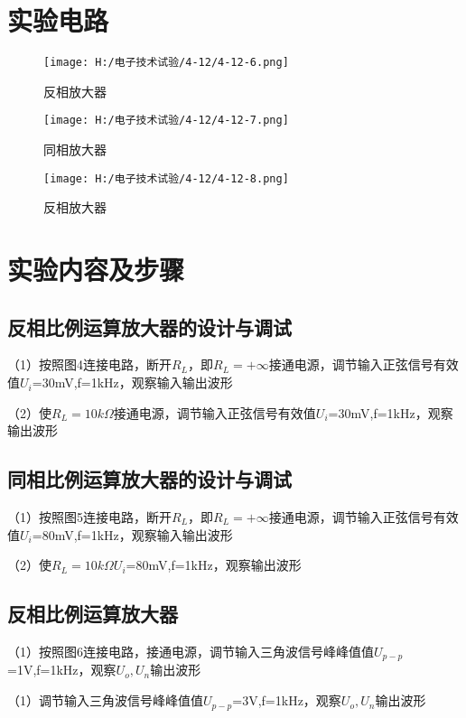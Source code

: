 \documentclass{article}
\begin{document}
\section{ 实验电路}

\begin{figure}[h]
	\begin{minipage}[t]{0.5\linewidth} %
	  \centering   
	  \texttt{[image: H:/电子技术试验/4-12/4-12-6.png]}   
	  \caption{反相放大器}   
	  \label{fig:side:a}   
	\end{minipage}%
	\begin{minipage}[t]{0.5\linewidth}   
	  \centering   
	  \texttt{[image: H:/电子技术试验/4-12/4-12-7.png]}   
	  \caption{同相放大器}   
	  \label{fig:side:b}   
	\end{minipage}   
  \end{figure}

\begin{figure}[h]
	\centering
	\texttt{[image: H:/电子技术试验/4-12/4-12-8.png]}
	\caption{反相放大器} \label{fig:aa}
\end{figure}

\section{ 实验内容及步骤}
\subsection {反相比例运算放大器的设计与调试}
（1）按照图4连接电路，断开$R_L$，即$R_L=+\infty$接通电源，调节输入正弦信号有效值$U_i$=30mV,f=1kHz，观察输入输出波形\par
（2）使$R_L=10k\Omega$接通电源，调节输入正弦信号有效值$U_i$=30mV,f=1kHz，观察输出波形
\subsection{同相比例运算放大器的设计与调试}
（1）按照图5连接电路，断开$R_L$，即$R_L=+\infty$接通电源，调节输入正弦信号有效值$U_i$=80mV,f=1kHz，观察输入输出波形\par
（2）使$R_L=10k\Omega$$U_i$=80mV,f=1kHz，观察输出波形
\subsection{反相比例运算放大器}
（1）按照图6连接电路，接通电源，调节输入三角波信号峰峰值值$U_{p-p}$=1V,f=1kHz，观察$U_o,U_n$输出波形\par
（1）调节输入三角波信号峰峰值值$U_{p-p}$=3V,f=1kHz，观察$U_o,U_n$输出波形\par
\newpage	
\end{document}
